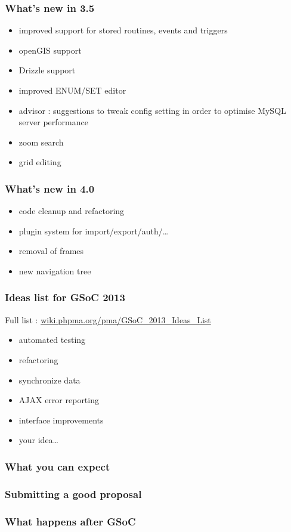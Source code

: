 \documentclass[14pt]{beamer}
\begin{document}
  \begin{frame}
    \frametitle{What's new in 3.5}
    \begin{itemize}
      \item improved support for stored routines, events and triggers
      \item openGIS support
      \item Drizzle support
      \item improved ENUM/SET editor
      \item advisor : suggestions to tweak config setting in order to optimise MySQL server performance
      \item zoom search
      \item grid editing
    \end{itemize}
  \end{frame}
  \begin{frame}
    \frametitle{What's new in 4.0}
    \begin{itemize}
      \item code cleanup and refactoring
      \item plugin system for import/export/auth/\ldots
      \item removal of frames
      \item new navigation tree
    \end{itemize}
  \end{frame}
  \begin{frame}
    \frametitle{Ideas list for GSoC 2013}
    Full list : \href{http://wiki.phpma.org/pma/GSoC\_2013\_Ideas\_List}{wiki.phpma.org/pma/GSoC\_2013\_Ideas\_List}
    \begin{itemize}
      \item automated testing
      \item refactoring
      \item synchronize data
      \item AJAX error reporting
      \item interface improvements
      \item your idea\ldots
    \end{itemize}
  \end{frame}
  \begin{frame}
    \frametitle{What you can expect}
  \end{frame}
  \begin{frame}
    \frametitle{Submitting a good proposal}
  \end{frame}
  \begin{frame}
    \frametitle{What happens after GSoC}
  \end{frame}
\end{document}
